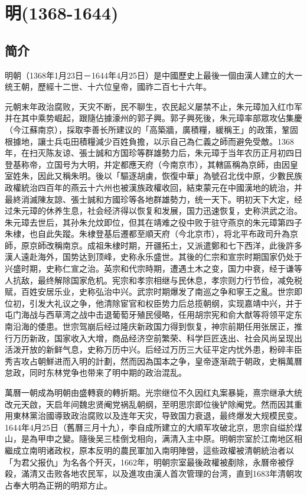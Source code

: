 
\chapter{明\tiny(1368-1644)}

\section{简介}

明朝（1368年1月23日－1644年4月25日）是中國歷史上最後一個由漢人建立的大一统王朝，歷經十二世、十六位皇帝，國祚二百七十六年。

元朝末年政治腐败，天灾不断，民不聊生，农民起义屡禁不止，朱元璋加入红巾军并在其中乘势崛起，跟隨佔據濠州的郭子興。郭子興死後，朱元璋率部眾攻佔集慶（今江蘇南京），採取李善长所建议的「高築牆，廣積糧，緩稱王」的政策，鞏固根據地，讓士兵屯田積糧減少百姓負擔，以示自己為仁義之師而避免受敵。1368年，在扫灭陈友谅、張士誠和方国珍等群雄勢力后，朱元璋于当年农历正月初四日登基称帝，立国号为大明，并定都應天府（今南京市），其轄區稱為京師，由因皇室姓朱，因此又稱朱明。後以「驅逐胡虜，恢復中華」為號召北伐中原，少數民族政權統治四百年的燕云十六州也被漢族政權收回，結束蒙元在中國漢地的統治，并最終消滅陳友諒、張士誠和方國珍等各地群雄勢力，统一天下。明初天下大定，经过朱元璋的休养生息，社会经济得以恢复和发展，国力迅速恢复，史称洪武之治。朱元璋去世后，其孙朱允炆即位，但其在靖难之役中败于驻守燕京的朱元璋第四子朱棣，也自此失蹤。朱棣登基后遷都至順天府（今北京市），将北平布政司升為京師，原京師改稱南京。成祖朱棣时期，开疆拓土，又派遣鄭和七下西洋，此後許多漢人遠赴海外，国势达到顶峰，史称永乐盛世。其後的仁宗和宣宗时期国家仍处于兴盛时期，史称仁宣之治。英宗和代宗時期，遭遇土木之变，国力中衰，经于谦等人抗敌，最终解除国家危机。宪宗和孝宗相继与民休息，孝宗则力行节俭，减免税赋，百姓安居乐业，史称弘治中兴。武宗时期爆发了南巡之争和寧王之亂。世宗即位初，引发大礼议之争，他清除宦官和权臣势力后总揽朝纲，实现嘉靖中兴，并于屯门海战与西草湾之战中击退葡萄牙殖民侵略，任用胡宗宪和俞大猷等将领平定东南沿海的倭患。世宗驾崩后经过隆庆新政国力得到恢复，神宗前期任用张居正，推行万历新政，国家收入大增，商品经济空前繁荣、科学巨匠迭出、社会风尚呈现出活泼开放的新鲜气息，史称万历中兴。后经过万历三大征平定内忧外患，粉碎丰臣秀吉攻占朝鮮进而入明的計劃，然而因為国本之争，皇帝逐渐疏于朝政，史稱萬曆怠政，同时东林党争也带来了明中期的政治混乱。

萬曆一朝成為明朝由盛轉衰的轉折期。光宗继位不久因红丸案暴毙，熹宗继承大统改元天啟，天启年间魏忠贤阉党祸乱朝纲，至明思宗即位後铲除阉党。然而因其重用東林黨治國導致政治腐败以及连年天灾，导致国力衰退，最终爆发大规模民变。1644年4月25日（舊曆三月十九），李自成所建立的大順军攻破北京，思宗自缢於煤山，是為甲申之變。隨後吴三桂倒戈相向，满清入主中原。明朝宗室於江南地区相繼成立南明诸政权，原本反明的農民軍加入南明陣營，這些政權被清朝統治者以「为君父报仇」为名各个歼灭，1662年，明朝宗室最後政權被剷除，永曆帝被俘殺，滿清又击败各地农民军，以及進攻由漢人首次管理的台湾，直到1683年清朝攻占奉大明為正朔的明郑方止。

